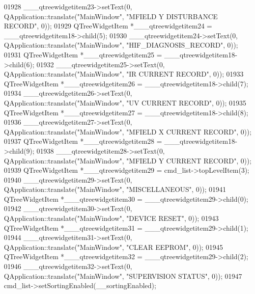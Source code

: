 \begin{DoxyCode}
01928         \_\_\_qtreewidgetitem23->setText(0, QApplication::translate(\textcolor{stringliteral}{"MainWindow"}, \textcolor{stringliteral}{"MFIELD Y  DISTURBANCE
       RECORD"}, 0));
01929         QTreeWidgetItem *\_\_\_qtreewidgetitem24 = \_\_\_qtreewidgetitem18->child(5);
01930         \_\_\_qtreewidgetitem24->setText(0, QApplication::translate(\textcolor{stringliteral}{"MainWindow"}, \textcolor{stringliteral}{"HIF\_DIAGNOSIS\_RECORD"}, 0));
01931         QTreeWidgetItem *\_\_\_qtreewidgetitem25 = \_\_\_qtreewidgetitem18->child(6);
01932         \_\_\_qtreewidgetitem25->setText(0, QApplication::translate(\textcolor{stringliteral}{"MainWindow"}, \textcolor{stringliteral}{"IR CURRENT RECORD"}, 0));
01933         QTreeWidgetItem *\_\_\_qtreewidgetitem26 = \_\_\_qtreewidgetitem18->child(7);
01934         \_\_\_qtreewidgetitem26->setText(0, QApplication::translate(\textcolor{stringliteral}{"MainWindow"}, \textcolor{stringliteral}{"UV CURRENT RECORD"}, 0));
01935         QTreeWidgetItem *\_\_\_qtreewidgetitem27 = \_\_\_qtreewidgetitem18->child(8);
01936         \_\_\_qtreewidgetitem27->setText(0, QApplication::translate(\textcolor{stringliteral}{"MainWindow"}, \textcolor{stringliteral}{"MFIELD X  CURRENT RECORD"}, 
      0));
01937         QTreeWidgetItem *\_\_\_qtreewidgetitem28 = \_\_\_qtreewidgetitem18->child(9);
01938         \_\_\_qtreewidgetitem28->setText(0, QApplication::translate(\textcolor{stringliteral}{"MainWindow"}, \textcolor{stringliteral}{"MFIELD Y  CURRENT RECORD"}, 
      0));
01939         QTreeWidgetItem *\_\_\_qtreewidgetitem29 = cmd\_list->topLevelItem(3);
01940         \_\_\_qtreewidgetitem29->setText(0, QApplication::translate(\textcolor{stringliteral}{"MainWindow"}, \textcolor{stringliteral}{"MISCELLANEOUS"}, 0));
01941         QTreeWidgetItem *\_\_\_qtreewidgetitem30 = \_\_\_qtreewidgetitem29->child(0);
01942         \_\_\_qtreewidgetitem30->setText(0, QApplication::translate(\textcolor{stringliteral}{"MainWindow"}, \textcolor{stringliteral}{"DEVICE RESET"}, 0));
01943         QTreeWidgetItem *\_\_\_qtreewidgetitem31 = \_\_\_qtreewidgetitem29->child(1);
01944         \_\_\_qtreewidgetitem31->setText(0, QApplication::translate(\textcolor{stringliteral}{"MainWindow"}, \textcolor{stringliteral}{"CLEAR EEPROM"}, 0));
01945         QTreeWidgetItem *\_\_\_qtreewidgetitem32 = \_\_\_qtreewidgetitem29->child(2);
01946         \_\_\_qtreewidgetitem32->setText(0, QApplication::translate(\textcolor{stringliteral}{"MainWindow"}, \textcolor{stringliteral}{"SUPERVISION STATUS"}, 0));
01947         cmd\_list->setSortingEnabled(\_\_sortingEnabled);

\end{DoxyCode}
